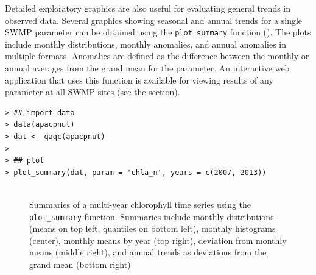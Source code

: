 \documentclass[10pt,letterpaper]{article}\usepackage[]{graphicx}\usepackage[]{color}
\makeatletter
\newenvironment{kframe}{%
 \def\at@end@of@kframe{}%
 \ifinner\ifhmode%
  \def\at@end@of@kframe{\end{minipage}}%
  \begin{minipage}{\columnwidth}%
 \fi\fi%
 \def\FrameCommand##1{\hskip\@totalleftmargin \hskip-\fboxsep
 \colorbox{shadecolor}{##1}\hskip-\fboxsep
     \hskip-\linewidth \hskip-\@totalleftmargin \hskip\columnwidth}%
 \MakeFramed {\advance\hsize-\width
   \@totalleftmargin\z@ \linewidth\hsize
   \@setminipage}}%
 {\par\unskip\endMakeFramed%
 \at@end@of@kframe}
\newenvironment{knitrout}{}{} %
\makeatother
\begin{document}
Detailed exploratory graphics are also useful for evaluating general trends in observed data.  Several graphics showing seasonal and annual trends for a single SWMP parameter can be obtained using the \texttt{plot\_summary} function ().  The plots include monthly distributions, monthly anomalies, and annual anomalies in multiple formats.  Anomalies are defined as the difference between the monthly or annual averages from the grand mean for the parameter.  An interactive web application \cite{Chang15} that uses this function is available for viewing results of any parameter at all \gls{SWMP} sites (see the  section).

\begin{knitrout}\small
{}\color{fgcolor}\begin{kframe}
\begin{verbatim}
> ## import data
> data(apacpnut)
> dat <- qaqc(apacpnut)
> 
> ## plot
> plot_summary(dat, param = 'chla_n', years = c(2007, 2013))
\end{verbatim}
\end{kframe}\begin{figure}[!h]

{\centering \includegraphics[width=0.00\textwidth]{figure/summary_ex-1} 

}

\caption[Summaries of a multi-year chlorophyll time series using the \texttt{plot\_summary} function]{Summaries of a multi-year chlorophyll time series using the \texttt{plot\_summary} function.  Summaries include monthly distributions (means on top left, quantiles on bottom left), monthly histograms (center), monthly means by year (top right), deviation from monthly means (middle right), and annual trends as deviations from the grand mean (bottom right)}\label{fig:summary_ex}
\end{figure}


\end{knitrout}
\end{document}
